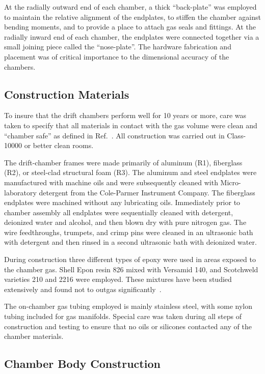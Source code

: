 At the radially outward end of each chamber, a thick ``back-plate'' was 
employed to maintain the relative 
alignment of the endplates, to stiffen the chamber against bending moments, 
and to provide a place to attach gas seals and fittings. At the radially inward 
end of each chamber, the endplates were connected together via a small joining 
piece called the ``nose-plate''.  The hardware fabrication and placement 
was of critical importance to the dimensional accuracy of the chambers.



\subsection{Construction Materials}
\label{materials}

To insure that the drift chambers perform well for 10 years or more, care was taken to 
specify that all materials in contact with the gas volume were clean and ``chamber 
safe'' as defined in Ref.~\cite{kadyk}.  All construction was carried out in 
Class-10000 or better clean rooms.

The drift-chamber frames were made primarily of aluminum (R1), fiberglass (R2),
or steel-clad structural foam (R3).  The aluminum and steel endplates were 
manufactured with machine oils and were subsequently cleaned with  
Micro-laboratory detergent from the Cole-Parmer Instrument Company.  The 
fiberglass endplates were machined without any lubricating oils.  Immediately 
prior to chamber assembly all endplates were sequentially cleaned with 
detergent,
deionized water and alcohol, and then blown dry with pure nitrogen gas.  The 
wire feedthroughs, trumpets, and crimp pins were cleaned in an ultrasonic bath 
with detergent and then rinsed in a second ultrasonic bath with deionized water.

During construction three different types of epoxy were used in areas exposed 
to the chamber gas.  Shell Epon resin 826 mixed with Versamid 140, and 
Scotchweld varieties 210 and 2216 were employed.  These mixtures have been 
studied extensively and found not to outgas significantly~\cite{nasa}.

The on-chamber gas tubing employed is mainly stainless steel, with some
nylon tubing included for gas manifolds.  Special care was taken during
all steps of construction and testing to ensure that no oils or
silicones contacted any of the chamber materials.



\subsection{Chamber Body Construction}

